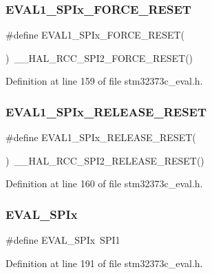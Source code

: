\subsubsection{E\+V\+A\+L1\+\_\+\+S\+P\+Ix\+\_\+\+F\+O\+R\+C\+E\+\_\+\+R\+E\+S\+ET}
{\footnotesize\ttfamily \#define E\+V\+A\+L1\+\_\+\+S\+P\+Ix\+\_\+\+F\+O\+R\+C\+E\+\_\+\+R\+E\+S\+ET(\begin{DoxyParamCaption}{ }\end{DoxyParamCaption})~\+\_\+\+\_\+\+H\+A\+L\+\_\+\+R\+C\+C\+\_\+\+S\+P\+I2\+\_\+\+F\+O\+R\+C\+E\+\_\+\+R\+E\+S\+ET()}



Definition at line 159 of file stm32373c\+\_\+eval.\+h.

\mbox{\label{group___l_e_d_gac5fa7eaba06b4c992bd9d5f4316741e8}} 
\subsubsection{E\+V\+A\+L1\+\_\+\+S\+P\+Ix\+\_\+\+R\+E\+L\+E\+A\+S\+E\+\_\+\+R\+E\+S\+ET}
{\footnotesize\ttfamily \#define E\+V\+A\+L1\+\_\+\+S\+P\+Ix\+\_\+\+R\+E\+L\+E\+A\+S\+E\+\_\+\+R\+E\+S\+ET(\begin{DoxyParamCaption}{ }\end{DoxyParamCaption})~\+\_\+\+\_\+\+H\+A\+L\+\_\+\+R\+C\+C\+\_\+\+S\+P\+I2\+\_\+\+R\+E\+L\+E\+A\+S\+E\+\_\+\+R\+E\+S\+ET()}



Definition at line 160 of file stm32373c\+\_\+eval.\+h.

\mbox{\label{group___l_e_d_gab5ff0ce8eab900baca44c217df199e39}} 
\subsubsection{E\+V\+A\+L\+\_\+\+S\+P\+Ix}
{\footnotesize\ttfamily \#define E\+V\+A\+L\+\_\+\+S\+P\+Ix~S\+P\+I1}



Definition at line 191 of file stm32373c\+\_\+eval.\+h.

